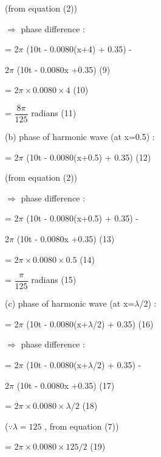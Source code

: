 \documentclass[journal,12pt,twocolumn]{IEEEtran}
\theoremstyle{remark}
\begin{document}
(from equation (2))

$\Rightarrow$  phase difference :

= 2$\pi$ (10t - 0.0080(x+4) + 0.35) -

2$\pi$ (10t - 0.0080x  +0.35) \hspace{3.3cm} (9)

= 2$\pi \times 0.0080 \times 4$ \hspace{4.4cm} (10)

\vspace{0.2cm}

= $\dfrac{8\pi}{125}$ radians \hspace{5cm} (11)

\vspace{0.5cm}
(b) phase of harmonic wave (at x=0.5) :

= 2$\pi$ (10t - 0.0080(x+0.5) + 0.35) \hspace{1.5cm} (12)

(from equation (2))

$\Rightarrow$  phase difference :

= 2$\pi$ (10t - 0.0080(x+0.5) + 0.35) -

2$\pi$ (10t - 0.0080x  +0.35) \hspace{3.1cm} (13)

= 2$\pi \times 0.0080 \times 0.5$ \hspace{4cm} (14)

\vspace{0.2cm}

= $\dfrac{\pi}{125}$ radians \hspace{5cm} (15)

\vspace{0.5cm}
(c) phase of harmonic wave (at x=$\lambda$/2) :

= 2$\pi$ (10t - 0.0080(x+$\lambda$/2) + 0.35) \hspace{1.5cm} (16)

$\Rightarrow$  phase difference :

= 2$\pi$ (10t - 0.0080(x+$\lambda$/2) + 0.35) -

2$\pi$ (10t - 0.0080x  +0.35) \hspace{3.1cm} (17)

= 2$\pi \times 0.0080 \times \lambda/2$ \hspace{4cm} (18)

($\because \lambda = 125$ ,  from equation (7))

= 2$\pi \times 0.0080 \times 125/2$ \hspace{4cm} (19)
\end{document}
